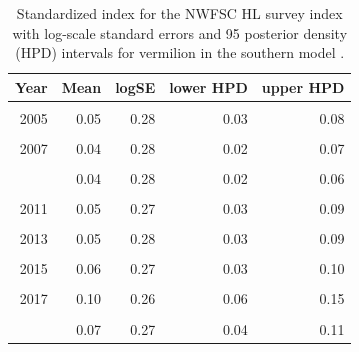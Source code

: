 \documentclass[
  english,
  a4paper,
]{article}
\begin{document}
\begin{table}

\caption{\label{tab:tab-index-nwfschl}Standardized index for the NWFSC HL survey index with log-scale standard errors and 95%
       posterior density (HPD) intervals for vermilion in the southern model .}
\centering
\begin{tabular}[t]{rrrrr}
\toprule
Year & Mean & logSE & lower HPD & upper HPD\\
\midrule
\cellcolor{gray!6}{2004} & \cellcolor{gray!6}{0.04} & \cellcolor{gray!6}{0.28} & \cellcolor{gray!6}{0.02} & \cellcolor{gray!6}{0.07}\\
2005 & 0.05 & 0.28 & 0.03 & 0.08\\
\cellcolor{gray!6}{2006} & \cellcolor{gray!6}{0.04} & \cellcolor{gray!6}{0.28} & \cellcolor{gray!6}{0.02} & \cellcolor{gray!6}{0.07}\\
2007 & 0.04 & 0.28 & 0.02 & 0.07\\
\cellcolor{gray!6}{2008} & \cellcolor{gray!6}{0.03} & \cellcolor{gray!6}{0.28} & \cellcolor{gray!6}{0.01} & \cellcolor{gray!6}{0.04}\\
\addlinespace
2009 & 0.04 & 0.28 & 0.02 & 0.06\\
\cellcolor{gray!6}{2010} & \cellcolor{gray!6}{0.04} & \cellcolor{gray!6}{0.28} & \cellcolor{gray!6}{0.02} & \cellcolor{gray!6}{0.06}\\
2011 & 0.05 & 0.27 & 0.03 & 0.09\\
\cellcolor{gray!6}{2012} & \cellcolor{gray!6}{0.05} & \cellcolor{gray!6}{0.28} & \cellcolor{gray!6}{0.03} & \cellcolor{gray!6}{0.07}\\
2013 & 0.05 & 0.28 & 0.03 & 0.09\\
\addlinespace
\cellcolor{gray!6}{2014} & \cellcolor{gray!6}{0.06} & \cellcolor{gray!6}{0.27} & \cellcolor{gray!6}{0.03} & \cellcolor{gray!6}{0.09}\\
2015 & 0.06 & 0.27 & 0.03 & 0.10\\
\cellcolor{gray!6}{2016} & \cellcolor{gray!6}{0.06} & \cellcolor{gray!6}{0.27} & \cellcolor{gray!6}{0.03} & \cellcolor{gray!6}{0.09}\\
2017 & 0.10 & 0.26 & 0.06 & 0.15\\
\cellcolor{gray!6}{2018} & \cellcolor{gray!6}{0.09} & \cellcolor{gray!6}{0.26} & \cellcolor{gray!6}{0.05} & \cellcolor{gray!6}{0.14}\\
\addlinespace
2019 & 0.07 & 0.27 & 0.04 & 0.11\\
\bottomrule
\end{tabular}
\end{table}
\end{document}
